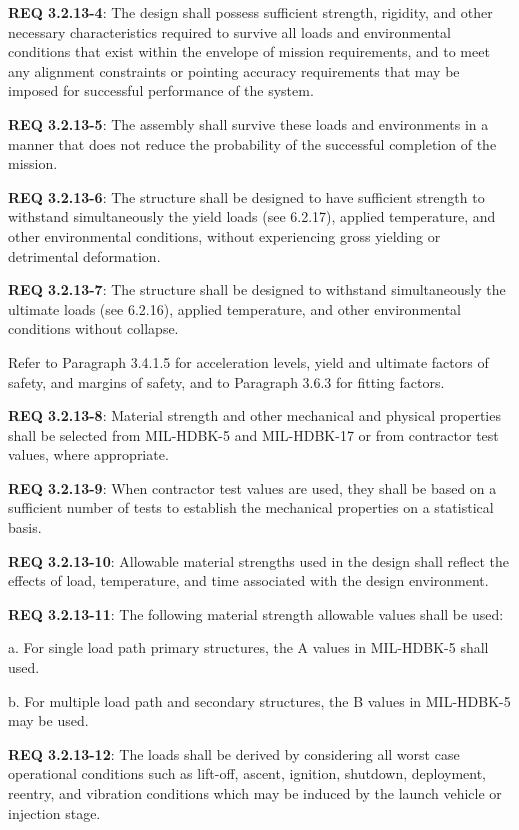 \documentclass[12pt]{article}
\begin{document}
\noindent \textbf{REQ 3.2.13-4}: The design shall possess sufficient strength, rigidity, and other necessary characteristics required to survive all loads and environmental conditions that exist within the envelope of mission requirements, and to meet any alignment constraints or pointing accuracy requirements that may be imposed for successful performance of the system. 

\noindent \textbf{REQ 3.2.13-5}: The assembly shall survive these loads and environments in a manner that does not reduce the probability of the successful completion of the mission. 

\noindent \textbf{REQ 3.2.13-6}: The structure shall be designed to have sufficient strength to withstand simultaneously the yield loads (see 6.2.17), applied temperature, and other environmental conditions, without experiencing gross yielding or detrimental deformation. 

\noindent \textbf{REQ 3.2.13-7}: The structure shall be designed to withstand simultaneously the ultimate loads (see 6.2.16), applied temperature, and other environmental conditions without collapse. 

Refer to Paragraph 3.4.1.5 for acceleration levels, yield and ultimate factors of safety, and margins of safety, and to Paragraph 3.6.3 for fitting factors. 

\noindent \textbf{REQ 3.2.13-8}: Material strength and other mechanical and physical properties shall be selected from MIL-HDBK-5 and MIL-HDBK-17 or from contractor test values, where appropriate. 

\noindent \textbf{REQ 3.2.13-9}: When contractor test values are used, they shall be based on a sufficient number of tests to establish the mechanical properties on a statistical basis. 

\noindent \textbf{REQ 3.2.13-10}: Allowable material strengths used in the design shall reflect the effects of load, temperature, and time associated with the design environment. 

\noindent \textbf{REQ 3.2.13-11}: The following material strength allowable values shall be used:

a. For single load path primary structures, the A values in MIL-HDBK-5 shall used.

b. For multiple load path and secondary structures, the B values in MIL-HDBK-5 may be used.

\noindent \textbf{REQ 3.2.13-12}: The loads shall be derived by considering all worst case operational conditions such as lift-off, ascent, ignition, shutdown, deployment, reentry, and vibration conditions which may be induced by the launch vehicle or injection stage. 
\end{document}
